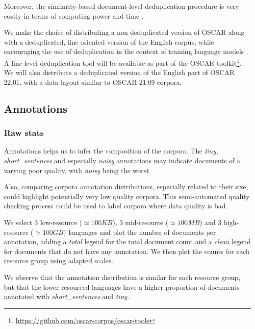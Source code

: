 Moreover, the similarity-based document-level deduplication procedure is very costly in terms of computing power and time \cite{gao-etal-2020-pile}.

We make the choice of distributing a non deduplicated version of OSCAR along with a deduplicated, line oriented version of the English corpus, while encouraging the use of deduplication in the context of training language models \cite{lee-etal-2021-deduplicating}.
A line-level deduplication tool will be available as part of the OSCAR toolkit\footnote{\url{https://github.com/oscar-corpus/oscar-tools}}. We will also distribute a deduplicated version of the English part of OSCAR 22.01, with a data layout similar to OSCAR 21.09 corpora.


\subsection{Annotations}

\subsubsection{Raw stats}

Annotations helps us to infer the composition of the corpora: The \textit{tiny}, \textit{short\_sentences} and especially \textit{noisy} annotations may indicate documents of a varying poor quality, with \textit{noisy} being the worst.

Also, comparing corpora annotation distributions, especially related to their size, could highlight potentially very low quality corpora. This semi-automated quality checking process could be used to label corpora where data quality is bad.

We select 3 low-resource ($\simeq100KB$), 3 mid-resource ($\simeq100MB$) and 3 high-resource ($\simeq100GB$) languages and plot the number of documents per annotation, adding a \textit{total} legend for the total document count and a \textit{clean} legend for documents that do not have any annotation. We then plot the counts for each resource group using adapted scales.

We observe that the annotation distribution is similar for each resource group, but that the lower resourced languages have a higher proportion of documents annotated with \textit{short\_sentences} and \textit{tiny}.

